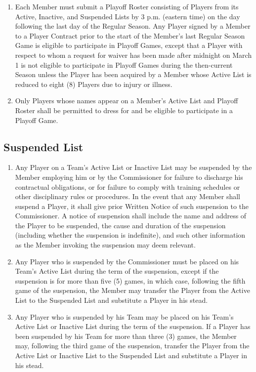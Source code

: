 \documentclass[]{book}
\providecommand{\tightlist}{%
  \setlength{\itemsep}{0pt}\setlength{\parskip}{0pt}}
\theoremstyle{definition}
\theoremstyle{definition}
\theoremstyle{definition}
\theoremstyle{remark}
\begin{document}
\begin{enumerate}
\def\labelenumi{(\alph{enumi})}
\tightlist
\item
  Each Member must submit a Playoff Roster consisting of Players from
  its Active, Inactive, and Suspended Lists by 3 p.m. (eastern time) on
  the day following the last day of the Regular Season. Any Player
  signed by a Member to a Player Contract prior to the start of the
  Member's last Regular Season Game is eligible to participate in
  Playoff Games, except that a Player with respect to whom a request for
  waiver has been made after midnight on March 1 is not eligible to
  participate in Playoff Games during the then-current Season unless the
  Player has been acquired by a Member whose Active List is reduced to
  eight (8) Players due to injury or illness.
\item
  Only Players whose names appear on a Member's Active List and Playoff
  Roster shall be permitted to dress for and be eligible to participate
  in a Playoff Game.
\end{enumerate}

\subsection{Suspended List}\label{suspended-list}

\begin{enumerate}
\def\labelenumi{(\alph{enumi})}
\tightlist
\item
  Any Player on a Team's Active List or Inactive List may be suspended
  by the Member employing him or by the Commissioner for failure to
  discharge his contractual obligations, or for failure to comply with
  training schedules or other disciplinary rules or procedures. In the
  event that any Member shall suspend a Player, it shall give prior
  Written Notice of such suspension to the Commissioner. A notice of
  suspension shall include the name and address of the Player to be
  suspended, the cause and duration of the suspension (including whether
  the suspension is indefinite), and such other information as the
  Member invoking the suspension may deem relevant.
\item
  Any Player who is suspended by the Commissioner must be placed on his
  Team's Active List during the term of the suspension, except if the
  suspension is for more than five (5) games, in which case, following
  the fifth game of the suspension, the Member may transfer the Player
  from the Active List to the Suspended List and substitute a Player in
  his stead.
\item
  Any Player who is suspended by his Team may be placed on his Team's
  Active List or Inactive List during the term of the suspension. If a
  Player has been suspended by his Team for more than three (3) games,
  the Member may, following the third game of the suspension, transfer
  the Player from the Active List or Inactive List to the Suspended List
  and substitute a Player in his stead.
\end{enumerate}
\end{document}
